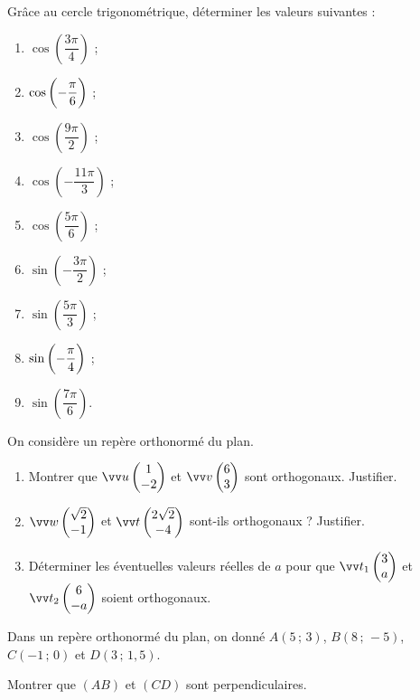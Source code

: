 \documentclass[a4paper,11pt]{article}
\begin{document}
\begin{cexercice}
Grâce au cercle trigonométrique, déterminer les valeurs suivantes :
\vspace{-0.5\baselineskip}
\begin{multicols}{3}
	\begin{enumerate}
		\item $\cos\left( \dfrac{3\pi}{4}\right)$ ;
		\item $\cos\left( -\dfrac{\vphantom{1}\pi}{6}\right)$ ;
		\item $\cos\left( \dfrac{9\pi}{2}\right)$ ;
		\item $\cos\left( -\dfrac{11\pi}{3}\right)$ ;
		\item $\cos\left( \dfrac{5\pi}{6}\right)$ ;
		\item $\sin\left( -\dfrac{3\pi}{2}\right)$ ;
		\item $\sin\left( \dfrac{5\pi}{3}\right)$ ;
		\item $\sin\left( -\dfrac{\vphantom{1}\pi}{4}\right)$ ;
		\item $\sin\left( \dfrac{7\pi}{6}\right)$.
	\end{enumerate}
\end{multicols}
\vspace*{0pt}
\end{cexercice}

\begin{cexercice}
On considère un repère orthonormé du plan.
%
\begin{enumerate}[]
	\item Montrer que $\vect{u} \coordeux{1}{-2}$ et $\vect{v} \coordeux{6}{3}$ sont orthogonaux. Justifier.
	\item $\vect{w} \coordeux{\sqrt{2}}{-1}$ et $\vect{t} \coordeux{2\sqrt{2}}{-4}$ sont-ils orthogonaux ? Justifier.
	\item Déterminer les éventuelles valeurs réelles de $a$ pour que $\vect{t_1} \coordeux{3}{a}$ et $\vect{t_2} \coordeux{6}{-a}$ soient orthogonaux.
\end{enumerate}
\end{cexercice}

\begin{cexercice}
Dans un repère orthonormé du plan, on donné $A(5\,;\,3)$, $B(8\,;\,-5)$, $C(-1\,;\,0)$ et $D(3\,;\,1,5)$.

Montrer que $(AB)$ et $(CD)$ sont perpendiculaires.
\end{cexercice}
\end{document}
